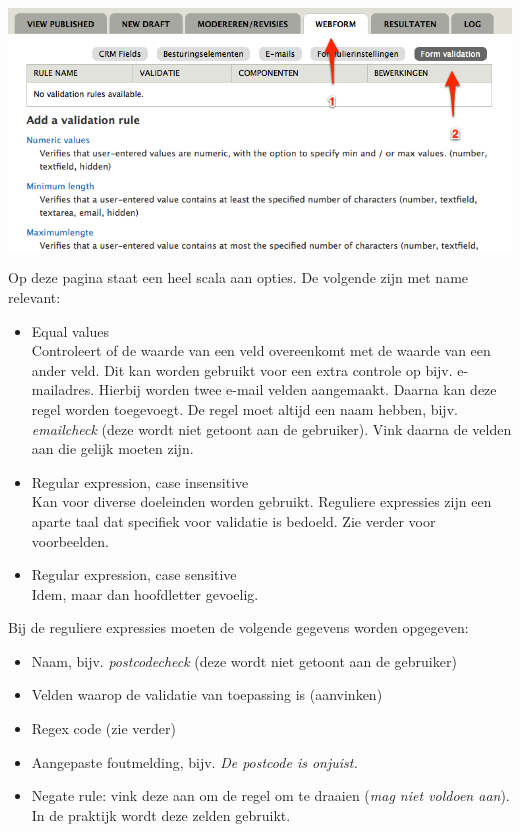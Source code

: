\begin{center}
\includegraphics[width=\textwidth]{img/formvalidation.png}
\end{center}

Op deze pagina staat een heel scala aan opties. De volgende zijn met name relevant:
\begin{itemize}
\item Equal values \\
Controleert of de waarde van een veld overeenkomt met de waarde van een ander veld. Dit kan worden gebruikt voor een extra controle op bijv. e-mailadres. Hierbij worden twee e-mail velden aangemaakt. Daarna kan deze regel worden toegevoegt. De regel moet altijd een naam hebben, bijv. \emph{emailcheck} (deze wordt niet getoont aan de gebruiker). Vink daarna de velden aan die gelijk moeten zijn.
\item Regular expression, case insensitive \\
Kan voor diverse doeleinden worden gebruikt. Reguliere expressies zijn een aparte taal dat specifiek voor validatie is bedoeld. Zie verder voor voorbeelden.
\item Regular expression, case sensitive \\
Idem, maar dan hoofdletter gevoelig.
\end{itemize}
Bij de reguliere expressies moeten de volgende gegevens worden opgegeven:
\begin{itemize}
\item Naam, bijv. \emph{postcodecheck} (deze wordt niet getoont aan de gebruiker)
\item Velden waarop de validatie van toepassing is (aanvinken)
\item Regex code (zie verder)
\item Aangepaste foutmelding, bijv. \emph{De postcode is onjuist.}
\item Negate rule: vink deze aan om de regel om te draaien (\emph{mag niet voldoen aan}). In de praktijk wordt deze zelden gebruikt.
\end{itemize}
